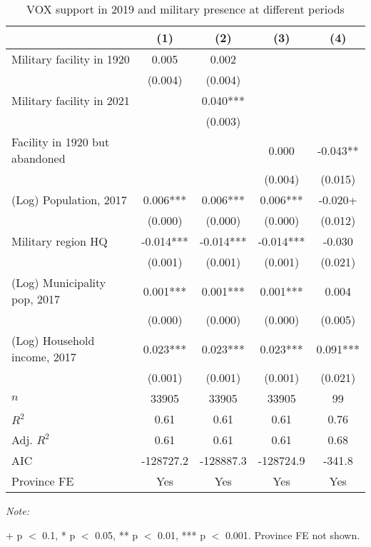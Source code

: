 \begin{table}[!h]

\caption{VOX support in 2019 and military presence at different periods\label{tab:lm\_vox\_c1920}}
\centering
\begin{threeparttable}
\begin{tabular}[t]{lcccc}
\toprule
  & (1) & (2) & (3) & (4)\\
\midrule
Military facility in 1920 & 0.005 & 0.002 &  & \\
 & (0.004) & (0.004) &  & \\
Military facility in 2021 &  & 0.040*** &  & \\
 &  & (0.003) &  & \\
Facility in 1920 but abandoned &  &  & 0.000 & -0.043**\\
 &  &  & (0.004) & (0.015)\\
(Log) Population, 2017 & 0.006*** & 0.006*** & 0.006*** & -0.020+\\
 & (0.000) & (0.000) & (0.000) & (0.012)\\
Military region HQ & -0.014*** & -0.014*** & -0.014*** & -0.030\\
 & (0.001) & (0.001) & (0.001) & \vphantom{1} (0.021)\\
(Log) Municipality pop, 2017 & 0.001*** & 0.001*** & 0.001*** & 0.004\\
 & (0.000) & (0.000) & (0.000) & (0.005)\\
(Log) Household income, 2017 & 0.023*** & 0.023*** & 0.023*** & 0.091***\\
 & (0.001) & (0.001) & (0.001) & (0.021)\\
\midrule
$n$ & 33905 & 33905 & 33905 & 99\\
$R^2$ & 0.61 & 0.61 & 0.61 & 0.76\\
Adj. $R^2$ & 0.61 & 0.61 & 0.61 & 0.68\\
AIC & -128727.2 & -128887.3 & -128724.9 & -341.8\\
Province FE & Yes & Yes & Yes & Yes\\
\bottomrule
\end{tabular}
\begin{tablenotes}[para]
\item \textit{Note: } 
\item + p $<$ 0.1, * p $<$ 0.05, ** p $<$ 0.01, *** p $<$ 0.001. Province FE not shown.
\end{tablenotes}
\end{threeparttable}
\end{table}
